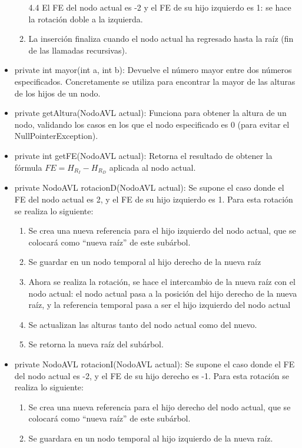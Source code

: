 \documentclass{article}
\begin{document}
\begin{itemize}
\begin{enumerate}
            4.4 El FE del nodo actual es -2 y el FE de su hijo izquierdo es 1: se hace la rotación doble a la izquierda.\\
\item La inserción finaliza cuando el nodo actual ha regresado hasta la raíz (fin de las llamadas recursivas).
\end{enumerate}
\item private int mayor(int a, int b): Devuelve el número mayor entre dos números especificados. Concretamente se utiliza para encontrar la mayor de las alturas de los hijos de un nodo.
\item private getAltura(NodoAVL actual): Funciona para obtener la altura de un nodo, validando los casos en los que el nodo especificado es 0 (para evitar el NullPointerException). 
\item private int getFE(NodoAVL actual): Retorna el resultado de obtener la fórmula $FE = H_{R_I} - H_{R_D}$
aplicada al nodo actual.
\item private NodoAVL rotacionD(NodoAVL actual): Se supone el caso donde el FE del nodo actual es 2, y el FE de su hijo izquierdo es 1. Para esta rotación se realiza lo siguiente:
\begin{enumerate}
\item Se crea una nueva referencia para el hijo izquierdo del nodo actual, que se colocará como “nueva raíz” de este subárbol.
\item Se guardar en un nodo temporal al hijo derecho de la nueva raíz
\item Ahora se realiza la rotación, se hace el intercambio de la nueva raíz con el nodo actual: el nodo actual pasa a la posición del hijo derecho de la nueva raíz, y la referencia temporal pasa a ser el hijo izquierdo del nodo actual
\item Se actualizan las alturas tanto del nodo actual como del nuevo.
\item Se retorna la nueva raíz del subárbol. 
\end{enumerate}
\item private NodoAVL rotacionI(NodoAVL actual): Se supone el caso donde el FE del nodo actual es -2, y el FE de su hijo derecho es -1. Para esta rotación se realiza lo siguiente:
\begin{enumerate}
\item Se crea una nueva referencia para el hijo derecho del nodo actual, que se colocará como “nueva raíz” de este subárbol.
\item Se guardara en un nodo temporal al hijo izquierdo de la nueva raíz.

\end{enumerate}
\end{itemize}
\end{document}

